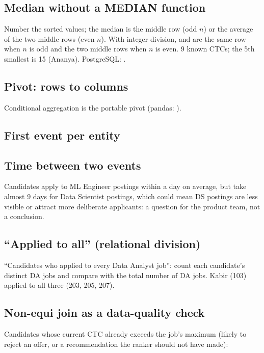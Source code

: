 \subsection{Median without a MEDIAN function}
Number the sorted values; the median is the middle row (odd $n$) or the average of the two middle rows (even $n$). With integer division,
 and  are the same row when $n$ is odd and the two middle rows when $n$ is even.
9 known CTCs; the 5th smallest is 15 (Ananya). PostgreSQL: .

\subsection{Pivot: rows to columns}
Conditional aggregation is the portable pivot (pandas: ).

\subsection{First event per entity}

\subsection{Time between two events}
Candidates apply to ML Engineer postings within a day on average, but take almost 9 days for Data Scientist postings, which could mean DS postings are
less visible or attract more deliberate applicants: a question for the product team, not a conclusion.

\subsection{``Applied to all'' (relational division)}
``Candidates who applied to every Data Analyst job'': count each candidate's distinct DA jobs and compare with the total number of DA jobs.
Kabir (103) applied to all three (203, 205, 207).

\subsection{Non-equi join as a data-quality check}
Candidates whose current CTC already exceeds the job's maximum (likely to reject an offer, or a recommendation the ranker should not have made):

